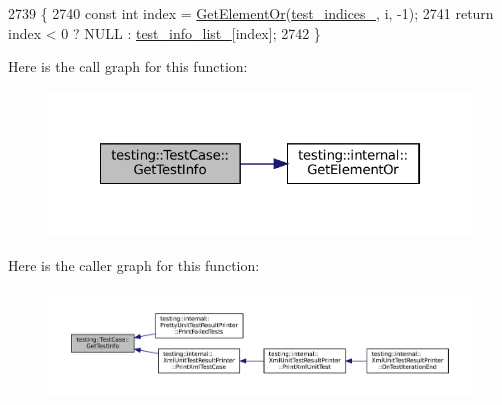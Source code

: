 \begin{DoxyCode}
2739                                                  \{
2740   \textcolor{keyword}{const} \textcolor{keywordtype}{int} index = \hyperlink{namespacetesting_1_1internal_a71fdd20a0686bea3dc0cdcd95e0bca1c}{GetElementOr}(\hyperlink{classtesting_1_1TestCase_a6bb04b98c46a3eecf7a4e6f62593a827}{test\_indices\_}, i, -1);
2741   \textcolor{keywordflow}{return} index < 0 ? NULL : \hyperlink{classtesting_1_1TestCase_adce272a48399dd67a7bdd14fa7e99b80}{test\_info\_list\_}[index];
2742 \}
\end{DoxyCode}
Here is the call graph for this function\+:
\nopagebreak
\begin{figure}[H]
\begin{center}
\leavevmode
\includegraphics[width=322pt]{classtesting_1_1TestCase_a441e0eca232643671dc365c2924c255c_cgraph}
\end{center}
\end{figure}
Here is the caller graph for this function\+:
\nopagebreak
\begin{figure}[H]
\begin{center}
\leavevmode
\includegraphics[width=350pt]{classtesting_1_1TestCase_a441e0eca232643671dc365c2924c255c_icgraph}
\end{center}
\end{figure}
\mbox{\label{classtesting_1_1TestCase_a00a4ea337b43015c71874ece0de58db7}} 
